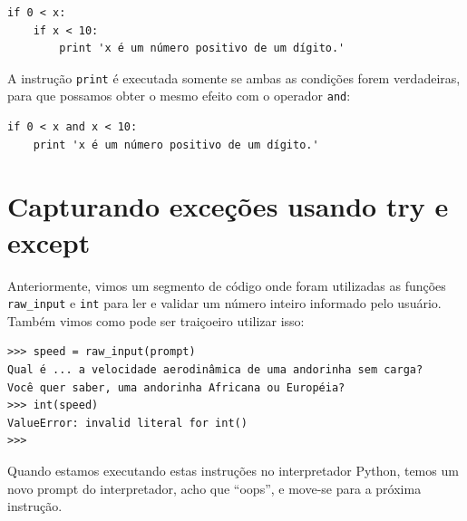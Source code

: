 
\beforeverb
\begin{verbatim}
if 0 < x:
    if x < 10:
        print 'x é um número positivo de um dígito.'
\end{verbatim}
%
A instrução {\tt print} é executada somente se ambas as condições forem 
verdadeiras, para que possamos obter o mesmo efeito com o operador {\tt and}:


\beforeverb
\begin{verbatim}
if 0 < x and x < 10:
    print 'x é um número positivo de um dígito.'
\end{verbatim}
\afterverb

\section{Capturando exceções usando try e except}
\label{catch1}

Anteriormente, vimos um segmento de código onde foram utilizadas as
funções \verb"raw_input" e {\tt int} para ler e validar um 
número inteiro informado pelo usuário. 
Também vimos como pode ser traiçoeiro utilizar isso:


\beforeverb
\begin{verbatim}
>>> speed = raw_input(prompt)
Qual é ... a velocidade aerodinâmica de uma andorinha sem carga?
Você quer saber, uma andorinha Africana ou Européia?
>>> int(speed)
ValueError: invalid literal for int()
>>>
\end{verbatim}
\afterverb
%
Quando estamos executando estas instruções no interpretador Python,
temos um novo prompt do interpretador, acho que ``oops'', e move-se
para a próxima instrução.

